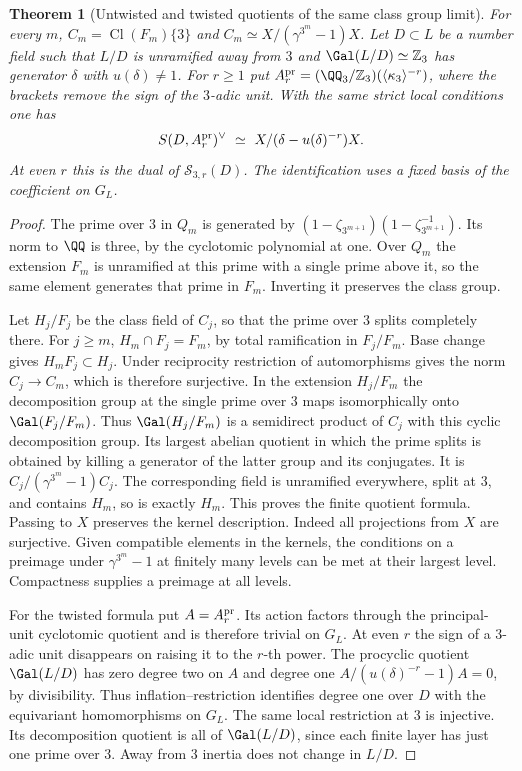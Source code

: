 \documentclass[a4paper,11pt]{article}
\newtheorem{theorem}[proposition]{Theorem}
\theoremstyle{definition}
\theoremstyle{remark}
\newcommand{\ZZ}{\mathbb Z}\newcommand{\ord}{\operatorname{ord}}
\numberwithin{equation}{section}
\newcommand{\Cl}{\operatorname{Cl}}
\begin{document}
\begin{theorem}[Untwisted and twisted quotients of the same class group limit]\leavevmode
\label{thm:control280}
For every \(m\), \(C_m=\Cl(F_m)\{3\}\) and
\(C_m\simeq X/(\gamma^{3^m}-1)X\).
Let \(D\subset L\) be a number field such that \(L/D\) is
unramified away from \(3\) and \(\Gal(L/D)\simeq\ZZ_3\)
has generator \(\delta\) with \(u(\delta)\ne1\).
For \(r\ge1\) put
\(A_r^{\rm pr}=(\QQ_3/\ZZ_3)(\langle\kappa_3\rangle^{-r})\),
where the brackets remove the sign of the \(3\)-adic unit.
With the same strict local conditions one has
\[
         S(D,A_r^{\rm pr})^\vee
                  \ \simeq\ X/(\delta-u(\delta)^{-r})X .
\]
At even \(r\) this is the dual of \(\mathcal S_{3,r}(D)\).
The identification uses a fixed basis of the coefficient on \(G_L\).
\end{theorem}
\begin{proof}
The prime over \(3\) in \(Q_m\) is generated by
\((1-\zeta_{3^{m+1}})(1-\zeta_{3^{m+1}}^{-1})\).
Its norm to \(\QQ\) is three, by the cyclotomic polynomial at
one. Over \(Q_m\) the extension \(F_m\) is unramified at this
prime with a single prime above it, so the same element
generates that prime in \(F_m\). Inverting it preserves the
class group.

Let \(H_j/F_j\) be the class field of \(C_j\), so that the
prime over \(3\) splits completely there. For \(j\ge m\),
\(H_m\cap F_j=F_m\), by total ramification in \(F_j/F_m\).
Base change gives \(H_mF_j\subset H_j\). Under reciprocity
restriction of automorphisms gives the norm \(C_j\to C_m\),
which is therefore surjective. In the extension \(H_j/F_m\)
the decomposition group at the single prime over \(3\) maps
isomorphically onto \(\Gal(F_j/F_m)\). Thus
\(\Gal(H_j/F_m)\) is a semidirect product of \(C_j\) with
this cyclic decomposition group. Its largest abelian quotient
in which the prime splits is obtained by killing a generator
of the latter group and its conjugates. It is
\(C_j/(\gamma^{3^m}-1)C_j\). The corresponding field is
unramified everywhere, split at \(3\), and contains \(H_m\),
so is exactly \(H_m\). This proves the finite quotient formula.
Passing to \(X\) preserves the kernel description. Indeed all
projections from \(X\) are surjective. Given compatible elements
in the kernels, the conditions on a preimage under
\(\gamma^{3^m}-1\) at finitely many levels can be met at their
largest level. Compactness supplies a preimage at all levels.

For the twisted formula put \(A=A_r^{\rm pr}\). Its action
factors through the principal-unit cyclotomic quotient and
is therefore trivial on \(G_L\). At even \(r\) the sign of a
\(3\)-adic unit disappears on raising it to the \(r\)-th power.
The procyclic quotient \(\Gal(L/D)\) has zero degree two on
\(A\) and degree one \(A/(u(\delta)^{-r}-1)A=0\), by
divisibility. Thus inflation--restriction identifies degree
one over \(D\) with the equivariant homomorphisms on \(G_L\).
The same local restriction at \(3\) is injective. Its
decomposition quotient is all of \(\Gal(L/D)\), since each
finite layer has just one prime over \(3\). Away from \(3\)
inertia does not change in \(L/D\).


\end{proof}
\end{document}
